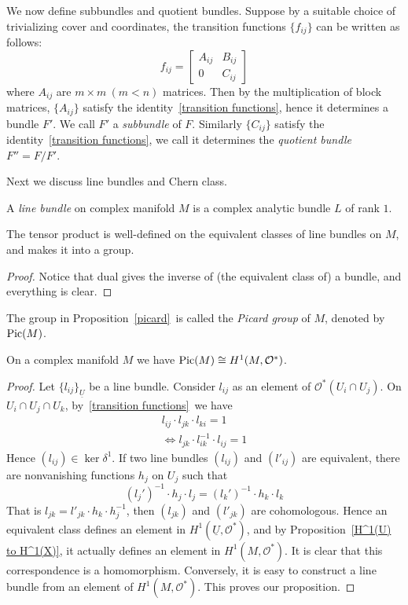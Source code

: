 We now define subbundles and quotient bundles.
Suppose by a suitable choice of trivializing cover and coordinates, the transition functions $\{f_{ij}\}$ can be written as follows:
\[f_{ij}=\begin{bmatrix}
    A_{ij} & B_{ij}\\
    0 & C_{ij}
\end{bmatrix}\]
where $A_{ij}$ are $m\times m\ (m<n)$ matrices.
Then by the multiplication of block matrices, $\{A_{ij}\}$ satisfy the identity~\eqref{transition functions}, hence it determines a bundle $F'$.
We call $F'$ a \emph{subbundle} of $F$.
Similarly $\{C_{ij}\}$ satisfy the identity~\eqref{transition functions}, we call it determines the \emph{quotient bundle} $F''=F/F'$.

Next we discuss line bundles and Chern class.
\begin{defn}
    A \emph{line bundle} on complex manifold $M$ is a complex analytic bundle $L$ of rank $1$.
\end{defn}

\begin{prop}\label{picard}
    The tensor product is well-defined on the equivalent classes of line bundles on $M$, and makes it into a group.
\end{prop}
\begin{proof}
    Notice that dual gives the inverse of (the equivalent class of) a bundle, and everything is clear.
\end{proof}

\begin{defn}
    The group in Proposition~\ref{picard}~is called the \emph{Picard group} of $M$, denoted by $\operatorname{Pic}(M)$.
\end{defn}

\begin{prop}
    On a complex manifold $M$ we have $\operatorname{Pic}(M)\cong H^1(M,\mathcal{O}^*)$.
\end{prop}
\begin{proof}
    Let $\{l_{ij}\}_{\underline{U}}$ be a line bundle.
    Consider $l_{ij}$ as an element of $\mathcal{O}^*(U_i\cap U_j)$.
    On $U_i\cap U_j\cap U_k$, by~\eqref{transition functions}~we have
    \begin{gather*}
        l_{ij}\cdot l_{jk}\cdot l_{ki}=1\\
        \iff l_{jk}\cdot l_{ik}^{-1}\cdot l_{ij}=1
    \end{gather*}
    Hence $(l_{ij})\in\ker\delta^1$.
    If two line bundles $(l_{ij})$ and $(l'_{ij})$ are equivalent, there are nonvanishing functions $h_j$ on $U_j$ such that
    \[(l_j')^{-1}\cdot h_j\cdot l_j=(l_k')^{-1}\cdot h_k\cdot l_k\]
    That is $l_{jk}=l'_{jk}\cdot h_k\cdot h_j^{-1}$, then $(l_{jk})$ and $(l'_{jk})$ are cohomologous.
    Hence an equivalent class defines an element in $H^1(\underline{{U}},\mathcal{O}^*)$, and by Proposition~\ref{H^1(U) to H^1(X)}, it actually defines an element in $H^1(M,\mathcal{O}^*)$.
    It is clear that this correspondence is a homomorphism.
    Conversely, it is easy to construct a line bundle from an element of $H^1(M,\mathcal{O}^*)$.
    This proves our proposition.
\end{proof}

